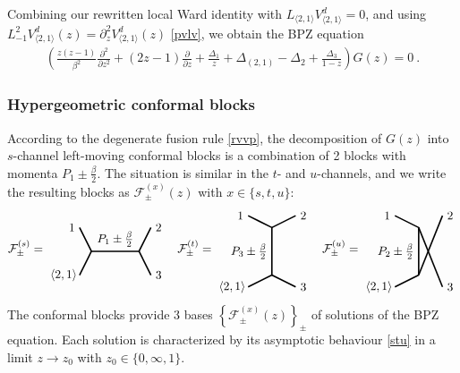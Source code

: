 \documentclass[12pt, a4paper]{article}
\begin{document}
Combining our rewritten local Ward identity with $L_{\langle 2,1\rangle}V^d_{\langle 2,1\rangle}=0$, and using $L_{-1}^2 V^d_{\langle 2,1\rangle}(z) = \partial_z^2 V^d_{\langle 2,1\rangle}(z)$ \eqref{pvlv}, we obtain the BPZ equation
\begin{align}
 \left(\frac{z(z-1)}{\beta^2}\frac{\partial^2}{\partial z^2} + (2z-1)\frac{\partial}{\partial z} + \frac{\Delta_1}{z} + \Delta_{(2,1)}-\Delta_2  +\frac{\Delta_3}{1-z} \right) G(z) = 0 \ .
\end{align}

\subsubsection{Hypergeometric conformal blocks}

According to the degenerate fusion rule \eqref{rvvp}, the decomposition of $G(z)$ into $s$-channel left-moving conformal blocks is a combination of 2 blocks with momenta $P_1\pm \frac{\beta}{2}$. The situation is similar in the $t$- and $u$-channels, and we write the resulting blocks as $\mathcal{F}^{(x)}_\pm(z)$ with $x\in\{s,t,u\}$:
\begin{align}
\mathcal{F}^{(s)}_\pm = 
 \begin{tikzpicture}[baseline=(current  bounding  box.center), very thick, scale = .35]
\draw (-1,2) node [left] {$1$} -- (0,0) -- node [above] {$P_1\pm\frac{\beta}{2}$} (4,0) -- (5,2) node [right] {$2$};
\draw (-1,-2) node [left] {$\langle 2,1\rangle\!$} -- (0,0);
\draw (4,0) -- (5,-2) node [right] {$3$};
\end{tikzpicture}
\quad 
\mathcal{F}^{(t)}_\pm = 
\begin{tikzpicture}[baseline=(current  bounding  box.center), very thick, scale = .35]
 \draw (-2,3) node [left] {$1$} -- (0,2) -- node [left] {$P_3\pm\frac{\beta}{2}$} (0,-2) -- (-2, -3) node [left] {$\langle 2,1\rangle\!$};
\draw (0,2) -- (2,3) node [right] {$2$};
\draw (0,-2) -- (2, -3) node [right] {$3$};
\end{tikzpicture}
\quad 
\mathcal{F}^{(u)}_\pm = 
\begin{tikzpicture}[baseline=(current  bounding  box.center), very thick, scale = .35]
\draw (-2,1) node [left] {$1$} -- (0,0) -- node [left] {$P_2\pm \frac{\beta}{2}$} (0,-4) ;
\draw (0,0)-- (2,-5) node [right] {$3$};
\draw (-2,-5) node [left] {$\langle 2,1\rangle\!$} -- (0,-4);
\draw (0,-4) -- (2,1) node [right] {$2$};
\end{tikzpicture} 
\end{align}
The conformal blocks provide 3 bases $\left\{\mathcal{F}^{(x)}_\pm(z)\right\}_\pm$ of solutions of the BPZ equation. Each solution is characterized by its asymptotic behaviour \eqref{stu} in a limit $z\to z_0$ with $z_0\in\{0,\infty,1\}$. 
\end{document}
